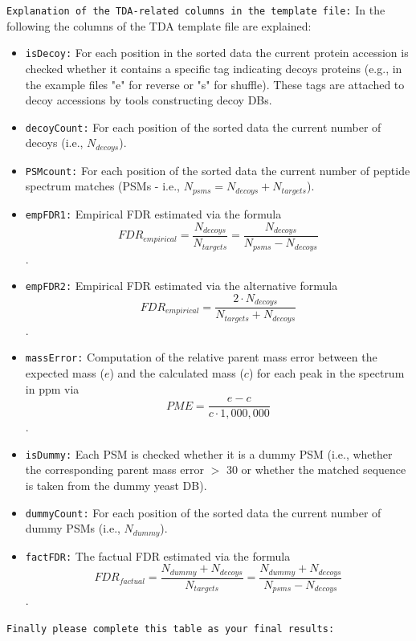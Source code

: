 \begin{task}
\texttt{Explanation of the TDA-related columns in the template file:} In the following the columns of the TDA template file are explained:
\begin{itemize}
	\item \texttt{isDecoy:} For each position in the sorted data the current protein accession is checked whether it contains a specific tag indicating decoys proteins (e.g., in the example files "e" for reverse or "s" for shuffle). These tags are attached to decoy accessions by tools constructing decoy DBs.
	\item \texttt{decoyCount:} For each position of the sorted data the current number of decoys (i.e., $N_{decoys}$).
	\item \texttt{PSMcount:} For each position of the sorted data the current number of peptide spectrum matches (PSMs - i.e., $N_{psms} = N_{decoys}+N_{targets}$).
	\item \texttt{empFDR1:} Empirical FDR estimated via the formula
		\[ FDR_{empirical} = \frac{N_{decoys}}{N_{targets}} = \frac{N_{decoys}}{N_{psms}-N_{decoys}} \].
	\item \texttt{empFDR2:} Empirical FDR estimated via the alternative formula
		\[ FDR_{empirical} = \frac{2 \cdot N_{decoys}}{N_{targets}+N_{decoys}} \].
	\item \texttt{massError:} Computation of the relative parent mass error between the expected mass ($e$) and the calculated mass ($c$) for each peak in the spectrum in ppm via 
		\[ PME = \frac{e-c}{c \cdot 1,000,000} \].
	\item \texttt{isDummy:} Each PSM is checked whether it is a dummy PSM (i.e., whether the corresponding parent mass error $>$ 30 or whether the matched sequence is taken from the dummy yeast DB).
	\item \texttt{dummyCount:} For each position of the sorted data the current number of dummy PSMs (i.e., $N_{dummy}$).
	\item \texttt{factFDR:} The factual FDR estimated via the formula
		\[ FDR_{factual} = \frac{N_{dummy}+N_{decoys}}{N_{targets}} = \frac{N_{dummy}+N_{decoys}}{N_{psms}-N_{decoys}} \].
\end{itemize}

\texttt{Finally please complete this table as your final results:}

\end{task}

